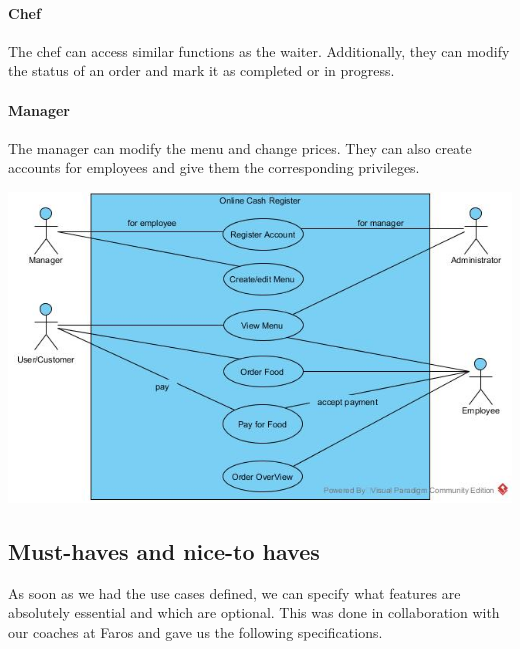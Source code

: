 \documentclass[12pt]{article}
\newenvironment{Figure}
	{\par\medskip\noindent\minipage{\linewidth}}
	{\endminipage\par\medskip}
\begin{document}
\begin{multicols}{2}
\paragraph{Chef}
The chef can access similar functions as the waiter. Additionally, they can modify the status of an order and mark it as completed or in progress.
\paragraph{Manager}
The manager can modify the menu and change prices. They can also create accounts for employees and give them the corresponding privileges.\\

\begin{Figure}
	\centering
	\includegraphics[width=\linewidth]{illustrations/usecase.jpg}
	\label{fig:usecase}
\end{Figure}

\label{sec:musthaves}
\subsection{Must-haves and nice-to haves}
As soon as we had the use cases defined, we can specify what features are absolutely essential and which are optional. This was done in collaboration with our coaches at Faros and gave us the following specifications.

\end{multicols}
\end{document}
